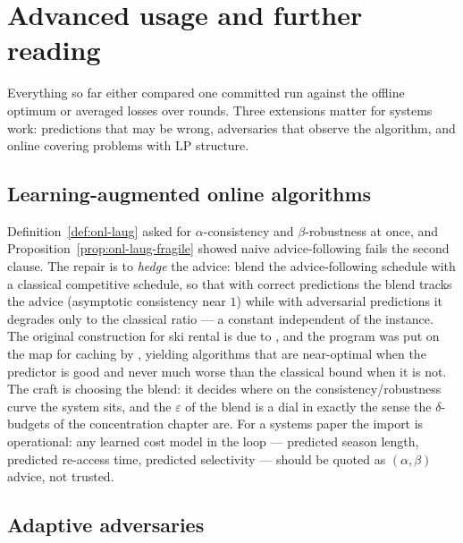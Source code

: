 \section{Advanced usage and further reading}
\label{sec:onl-advanced}

Everything so far either compared one committed run against the offline
optimum or averaged losses over rounds. Three extensions matter for systems
work: predictions that may be wrong, adversaries that observe the algorithm,
and online covering problems with LP structure.

\subsection{Learning-augmented online algorithms}
\label{sec:onl-laug-advanced}

Definition~\ref{def:onl-laug} asked for $\alpha$-consistency and
$\beta$-robustness at once, and Proposition~\ref{prop:onl-laug-fragile} showed
naive advice-following fails the second clause. The repair is to \emph{hedge}
the advice: blend the advice-following schedule with a classical competitive
schedule, so that with correct predictions the blend tracks the advice (asymptotic
consistency near $1$) while with adversarial predictions it degrades only to
the classical ratio --- a constant independent of the instance. The original
construction for ski rental is due to \citep{online-decisions-bg13}, and the
program was put on the map for caching by \citep{online-decisions-bg9},
yielding algorithms that are near-optimal when the predictor is good and never
much worse than the classical bound when it is not. The craft is choosing the
blend: it decides where on the consistency/robustness curve the system sits,
and the $\varepsilon$ of the blend is a dial in exactly the sense the
$\delta$-budgets of the concentration chapter are. For a systems paper the
import is operational: any learned cost model in the loop --- predicted season
length, predicted re-access time, predicted selectivity --- should be quoted
as $(\alpha,\beta)$ advice, not trusted.

\subsection{Adaptive adversaries}
\label{sec:onl-adaptive}

